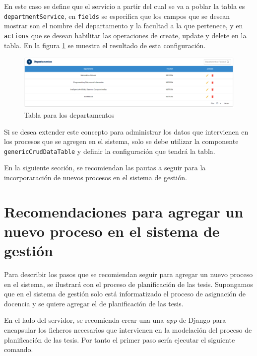 En este caso se define que el servicio a partir del cual se 
va a poblar la tabla es \texttt{departmentService}, en \texttt{fields}
se especifica que los campos que se desean 
mostrar son el nombre del departamento y la facultad a la que pertenece, y en 
\texttt{actions} que se desean habilitar las operaciones 
de create, update y delete en la tabla. En la 
figura \ref{cap5-table-department} se muestra el resultado de esta configuración.

\begin{figure}[H]
    \centering
    \includegraphics[scale=0.3]{Graphics/Extensibility/department-table.png}
    \caption{Tabla para los departamentos}
    \label{cap5-table-department}
\end{figure}


Si se desea extender este concepto para administrar los datos que intervienen
en los procesos que se agregen en el sistema,
solo se debe utilizar la componente \texttt{genericCrudDataTable}
y definir la configuración que tendrá la tabla.



En la siguiente sección, se recomiendan las pautas a seguir para la incorporaración 
de nuevos procesos en el sistema de gestión.

\section{Recomendaciones para agregar un nuevo proceso en el sistema de gestión}\label{cap5:recommendations}
Para describir los pasos que se recomiendan seguir para agregar un nuevo proceso en el sistema,
se ilustrará con el proceso de planificación de las tesis. Supongamos que en el 
sistema de gestión solo está informatizado el proceso de asignación de docencia y se 
quiere agregar el de planificación de las tesis.

En el lado del servidor,
se recomienda crear una una \textit{app} de Django para encapsular los ficheros necesarios 
que intervienen en la modelación del proceso de planificación de las tesis.
Por tanto el primer paso sería ejecutar el siguiente comando.

